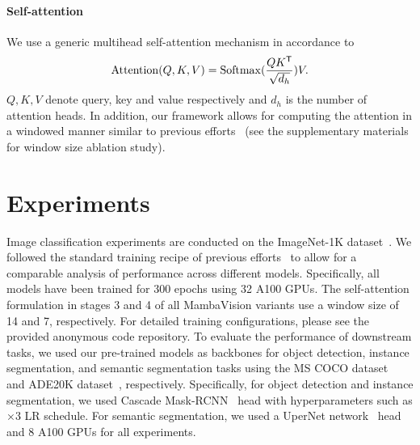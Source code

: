 \documentclass[10pt,twocolumn,letterpaper]{article}
\begin{document}
\paragraph{Self-attention} We use a generic multihead self-attention mechanism in accordance to
\begin{equation}
    {\rm Attention}({Q}, {K}, {V}) = {\rm Softmax}(\frac{{Q}{K}^\mathsf{T}}{\sqrt{d_{h}}}){V}.
    \label{eqn:mhsa}
\end{equation}
$Q, K, V$ denote query, key and value respectively and $d_{h}$ is the number of attention heads. In addition, our framework allows for computing the attention in a windowed manner similar to previous efforts~\cite{liu2021swin, liu2022swin} (see the supplementary materials for window size ablation study). 




\section{Experiments}
Image classification experiments are conducted on the ImageNet-1K dataset~\cite{deng2009imagenet}. We followed the standard training recipe of previous efforts~\cite{liu2021swin,yang2021focal,hatamizadeh2023global} to allow for a comparable analysis of performance across different models. Specifically, all models have been trained for 300 epochs using 32 A100 GPUs. The self-attention formulation in stages 3 and 4 of all MambaVision variants use a window size of 14 and 7, respectively. For detailed training configurations, please see the provided anonymous code repository. To evaluate the performance of downstream tasks, we used our pre-trained models as backbones for object detection, instance segmentation, and semantic segmentation tasks using the MS COCO dataset~\cite{lin2014microsoft} and ADE20K dataset~\cite{zhou2017scene}, respectively. Specifically, for object detection and instance segmentation, we used Cascade Mask-RCNN~\cite{he2017mask} head with hyperparameters such as ×3 LR schedule. For semantic segmentation, we used a UperNet network~\cite{xiao2018unified} head and 8 A100 GPUs for all experiments.
\end{document}
